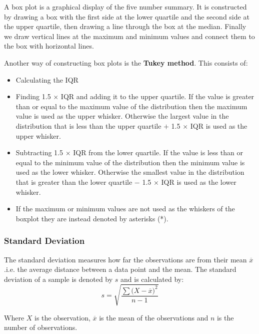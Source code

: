 \documentclass[12pt letter]{report}
\begin{document}
A box plot is a graphical display of the five number summary. It is constructed by drawing a box with the first side at
the lower quartile and the second side at the upper quartile, then drawing a line through the box at the median. Finally
we draw vertical lines at the maximum and minimum values and connect them to the box with horizontal lines.




Another way of constructing box plots is the \textbf{Tukey method}. This consists of:
\begin{itemize}
	\item Calculating the IQR
	\item Finding 1.5 $\times$ IQR and adding it to the upper quartile. If the value is greater than or equal to the
	      maximum value of the distribution then the maximum value is used as the upper whisker. Otherwise the largest
	      value in the distribution that
	      is less than the upper quartile $+$ 1.5 $\times$ IQR is used as the upper whisker.
	\item Subtracting 1.5 $\times$ IQR from the lower quartile. If the value is less than or equal to the minimum value of
	      the distribution then the minimum value is used as the lower whisker. Otherwise the smallest value in the
	      distribution that is greater than
	      the lower quartile $-$ 1.5 $\times$ IQR is used as the lower whisker.
	\item If the maximum or minimum values are not used as the whiskers of the boxplot they are instead denoted by
	      asterisks (*).
\end{itemize}

\subsubsection{Standard Deviation}

The standard deviation measures how far the observations are from their mean $\overline{x}$ .i.e. the average distance
between a data point and the mean. The standard deviation of a sample is denoted by $s$ and is calculated by:
\[
	s = \sqrt{\frac{\sum{(X - \overline{x}})^2}{n - 1}}
\]

Where $X$ is the observation, $\overline{x}$ is the mean of the observations and $n$ is the number of observations.

\end{document}
